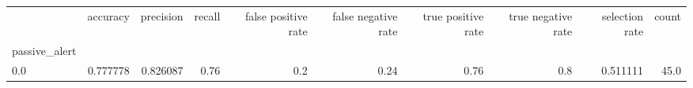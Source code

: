 \begin{tabular}{lrrrrrrrrr}
\toprule
{} &  accuracy &  precision &  recall &  false positive rate &  false negative rate &  true positive rate &  true negative rate &  selection rate &  count \\
passive\_alert &           &            &         &                      &                      &                     &                     &                 &        \\
\midrule
0.0           &  0.777778 &   0.826087 &    0.76 &                  0.2 &                 0.24 &                0.76 &                 0.8 &        0.511111 &   45.0 \\
\bottomrule
\end{tabular}
